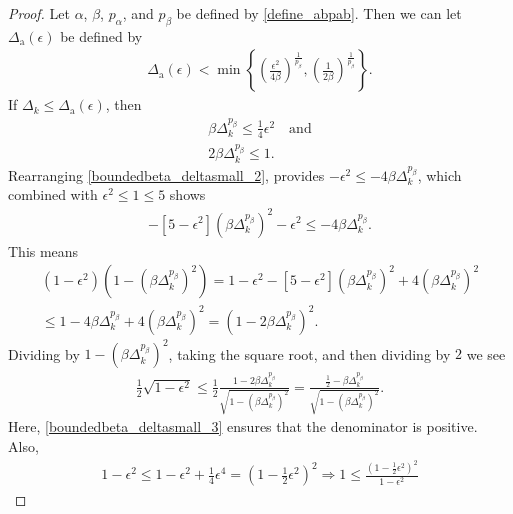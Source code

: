\documentclass{article}
\theoremstyle{case}
\numberwithin{theorem}{subsection}
\newcommand{\dacco}{{\Delta_{\textrm{a}}}}
\newcommand{\dk}{\Delta_k}
\newcommand{\minangledelta}{{\Delta_{\alpha^{\star}}}}
\begin{document}
\begin{proof}
Let $\alpha$, $\beta$, $p_{\alpha}$, and $p_{\beta}$ be defined by \cref{define_abpab}.
Then we can let $\dacco(\epsilon)$ be defined by
\begin{align}
\dacco(\epsilon) < \min\left\{
\left(\frac {\epsilon ^2} {4\beta} \right)^{\frac 1 {p_{\beta}}},
\left(\frac 1 {2\beta}\right)^{\frac 1 {p_{\beta}}}
\right\}\label{define_delta_accuracy_old}.
\end{align}
If $\dk \le \dacco(\epsilon)$, then
\begin{align}
\beta\dk^{p_{\beta}} \le \frac 1 {4} \epsilon^2 \quad \textrm{and}\label{boundedbeta_deltasmall_2} \\
2\beta\dk^{p_{\beta}} \le 1. \label{boundedbeta_deltasmall_3}
\end{align}
Rearranging \cref{boundedbeta_deltasmall_2}, provides $-\epsilon^2 \le -4\beta\dk^{p_{\beta}}$,
which combined with $\epsilon ^2 \le 1 \le 5$ shows
\begin{align*}
-\left[5- \epsilon^2\right]\left(\beta\dk^{p_{\beta}}\right)^2  - \epsilon^2 \le -4\beta\dk^{p_{\beta}}.
\end{align*}
This means
\begin{align*}
\left(1 - \epsilon^2\right)\left(1 - \left(\beta\dk^{p_{\beta}}\right)^2\right) 
= 1 - \epsilon^2 - \left[5 - \epsilon^2\right]\left(\beta\dk^{p_{\beta}}\right)^2 + 4\left(\beta\dk^{p_{\beta}}\right)^2 \\
\le 1 - 4\beta\dk^{p_{\beta}} + 4\left(\beta\dk^{p_{\beta}}\right)^2 = \left(1 - 2\beta\dk^{p_{\beta}}\right)^2.
\end{align*}
Dividing by $1 - \left(\beta\dk^{p_{\beta}}\right)^2$, taking the square root, and then dividing by $2$ we see
\begin{align}
\frac 1 2 \sqrt{1 - \epsilon^2} \le \frac 1 2 \frac{1 -2\beta\dk^{p_{\beta}}}{\sqrt{1 - \left(\beta\dk^{p_{\beta}}\right)^2}}
= \frac{\frac 1 2 -\beta\dk^{p_{\beta}}}{\sqrt{1 - \left(\beta\dk^{p_{\beta}}\right)^2}}. \label{boundedbeta_eqn1}
\end{align}
Here, \cref{boundedbeta_deltasmall_3} ensures that the denominator is positive.
Also,
\begin{align*}
1 - \epsilon^2 \le 1 - \epsilon^2 + \frac 1 4 \epsilon^4 
= \left(1 - \frac 1 2 \epsilon^2 \right)^2 
\Longrightarrow 1 \le \frac{\left(1 - \frac 1 2 \epsilon^2\right)^2}{1 - \epsilon^2}

\end{align*}
\end{proof}
\end{document}
